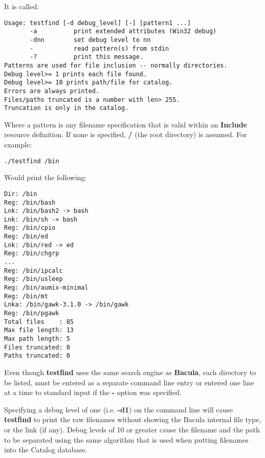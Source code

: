 It is called:

\footnotesize
\begin{verbatim}
Usage: testfind [-d debug_level] [-] [pattern1 ...]
       -a          print extended attributes (Win32 debug)
       -dnn        set debug level to nn
       -           read pattern(s) from stdin
       -?          print this message.
Patterns are used for file inclusion -- normally directories.
Debug level>= 1 prints each file found.
Debug level>= 10 prints path/file for catalog.
Errors are always printed.
Files/paths truncated is a number with len> 255.
Truncation is only in the catalog.
\end{verbatim}
\normalsize

Where a pattern is any filename specification that is valid within an {\bf
Include} resource definition. If none is specified, {\bf /} (the root
directory) is assumed. For example:

\footnotesize
\begin{verbatim}
./testfind /bin
\end{verbatim}
\normalsize

Would print the following:

\footnotesize
\begin{verbatim}
Dir: /bin
Reg: /bin/bash
Lnk: /bin/bash2 -> bash
Lnk: /bin/sh -> bash
Reg: /bin/cpio
Reg: /bin/ed
Lnk: /bin/red -> ed
Reg: /bin/chgrp
...
Reg: /bin/ipcalc
Reg: /bin/usleep
Reg: /bin/aumix-minimal
Reg: /bin/mt
Lnka: /bin/gawk-3.1.0 -> /bin/gawk
Reg: /bin/pgawk
Total files    : 85
Max file length: 13
Max path length: 5
Files truncated: 0
Paths truncated: 0
\end{verbatim}
\normalsize

Even though {\bf testfind} uses the same search engine as {\bf Bacula}, each
directory to be listed, must be entered as a separate command line entry or
entered one line at a time to standard input if the {\bf -} option was
specified.

Specifying a debug level of one (i.e. {\bf -d1}) on the command line will
cause {\bf testfind} to print the raw filenames without showing the Bacula
internal file type, or the link (if any). Debug levels of 10 or greater cause
the filename and the path to be separated using the same algorithm that is
used when putting filenames into the Catalog database.
